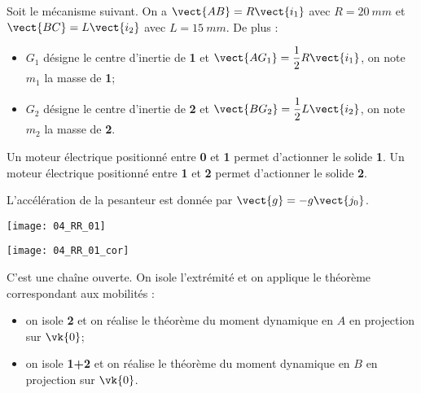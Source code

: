 \normaltrue
\correctiontrue


\setcounter{question}{0}%
\ifcorrection
\else
{}
\fi

\ifprof
\else
Soit le mécanisme suivant. On a $\vect{AB}=R\vect{i_1}$ avec $R=\SI{20}{mm}$ et  
$\vect{BC}=L\vect{i_2}$ avec $L=\SI{15}{mm}$. De plus :
\begin{itemize}
\item $G_1$ désigne le centre d'inertie de \textbf{1} et $\vect{AG_1}=\dfrac{1}{2}R\vect{i_1}$, on note $m_1$ la masse de \textbf{1}; %
\item $G_2$ désigne le centre d'inertie de \textbf{2} et $\vect{BG_2}=\dfrac{1}{2}L\vect{i_2}$, on note $m_2$ la masse de \textbf{2}.%
\end{itemize}

Un moteur électrique positionné entre \textbf{0} et \textbf{1} permet d'actionner le solide \textbf{1}.
Un moteur électrique positionné entre \textbf{1} et \textbf{2} permet d'actionner le solide \textbf{2}.

L'accélération de la pesanteur est donnée par $\vect{g}=-g\vect{j_0}$.

\begin{marginfigure}
\texttt{[image: 04\_RR\_01]}
\end{marginfigure}
\fi

\ifprof

\begin{marginfigure}
\texttt{[image: 04\_RR\_01\_cor]}
\end{marginfigure}
\else
\fi

\ifprof
C'est une chaîne ouverte. On isole l'extrémité et on applique le théorème correspondant aux mobilités : 
\begin{itemize}
\item on isole \textbf{2} et on réalise le théorème du moment dynamique en $A$ en projection sur $\vk{0}$;
\item on isole \textbf{1+2} et on réalise le théorème du moment dynamique en $B$ en projection sur $\vk{0}$.
\end{itemize}
\else
\fi


\ifprof
\else


\fi